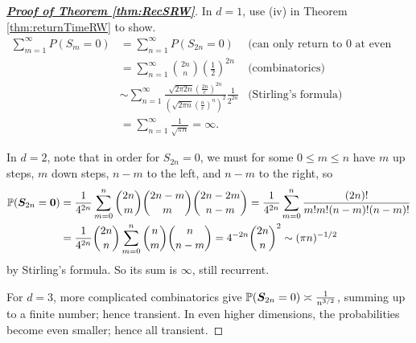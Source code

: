 \documentclass[10pt,a4paper]{article}
\begin{document}
\begin{proof}[\underline{\textbf{Proof of Theorem \ref{thm:RecSRW}}}]
	In $d=1$, use (iv) in Theorem \ref{thm:returnTimeRW} to show. 
	\begin{align*}
		\sum_{m=1}^{\infty}P(S_{m}=0)& =\sum_{n=1}^{\infty}P(S_{2n}=0) & \text{(can only return to 0 at even steps)} \\
		&=\sum\limits_{n=1}^\infty\binom{2n}{n}(\frac{1}{2})^{2n}& \text{(combinatorics)} \\
		&\sim\sum_{n=1}^\infty\frac{\sqrt{2\pi2n}(\frac{2n}e)^{2n}}{(\sqrt{2\pi n}(\frac ne)^n)^2}\frac1{2^{2n}}& \text{(Stirling's formula)} \\
		&=\sum_{n=1}^\infty\frac1{\sqrt{\pi n}}=\infty.
	\end{align*}

	In $d=2$, note that in order for $S_{2n}=0$, we must for some $0\leq m\leq n$ have $m$ up steps, $m$ down steps, $n-m$ to the left, and $n-m$ to the right, so 
	\begin{align*}
		\mathbb P({\boldsymbol S}_{2n}={\boldsymbol 0})&=\frac{1}{4^{2n}}\sum_{m=0}^{n}\binom{2n}{m}\binom{2n-m}{m}\binom{2n-2m}{n-m}=\frac{1}{4^{2n}}\sum_{m=0}^{n}\frac{(2n)!}{m! m! (n-m)! (n-m)!}\\
		&=\frac{1}{4^{2n}}\binom{2n}n\sum_{m=0}^n\binom nm\binom n{n-m}=4^{-2n}\binom{2n}n^2\sim (\pi n)^{-1/2}
	\end{align*}  
	by Stirling's formula. So its sum is $\infty $, still recurrent.
	
	For $d=3$, more complicated combinatorics give $\mathbb P({\boldsymbol S}_{2n}=0)\asymp\frac{1}{n^{3/2}}$, summing up to a finite
	number; hence transient. In even higher dimensions, the probabilities become even smaller;
	hence all transient.
\end{proof}
\end{document}
